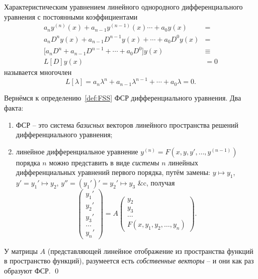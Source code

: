 \documentclass[12pt]{report}
\begin{document}
Характеристическим уравнением линейного однородного дифференциального уравнения с постоянными коэффициентами
\begin{align*}
	a_ny^{(n)}(x)+ a_{n-1}y^{(n-1)}(x)\cdots + a_0y(x) &= \\
	a_nD^ny(x) + a_{n-1}D^{n-1}y(x) + \cdots + a_0D^0y(x) &= \\
	\Big[a_nD^n + a_{n-1}D^{n-1} + \cdots + a_0D^0\Big]y(x) &\equiv \\
	L[D]y(x) &=0
\end{align*}
называется многочлен
\[
	L[\lambda] = a_n\lambda^n + a_{n-1}\lambda^{n-1}+\cdots+a_0\lambda = 0.
\]

\begin{rmk}
	Вернёмся к определению~\ref{def:FSS} ФСР дифференциального уравнения. Два факта:
	\begin{enumerate}[(1)]
		\item ФСР -- это система \emph{базисных} векторов линейного пространства решений дифференциального уравнения;
		\item линейное дифференциальное уравнение $y^{(n)} = F(x, y, y', \dots, y^{(n-1)})$ порядка $n$ можно представить в виде \emph{системы} $n$ линейных дифференциальных уравнений первого порядка, путём замены: $y\mapsto y_1$, $y' = y_1' \mapsto y_2$, $y'' = (y_1')' = y_2' \mapsto y_3$ \&c, получая
		\[
			\begin{pmatrix}
			y_1' \\ y_2'\\ y_3'\\ \dots \\ y_n'
			\end{pmatrix} = 
			A\begin{pmatrix}
			y_2\\ y_3 \\ \dots \\ F(x, y_1, y_2, \dots, y_n)
			\end{pmatrix}.
		\]
	\end{enumerate}
	У матрицы $A$ (представляющей линейное отображение из пространства функций в пространство функций), разумеется есть \emph{собственные векторы} -- и они как раз образуют ФСР. \qed
\end{rmk}
\end{document}
